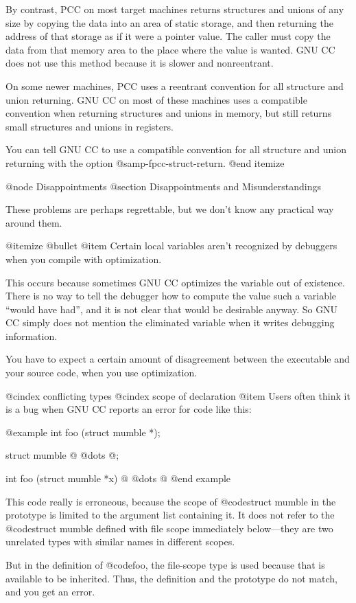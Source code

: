By contrast, PCC on most target machines returns structures and unions
of any size by copying the data into an area of static storage, and then
returning the address of that storage as if it were a pointer value.
The caller must copy the data from that memory area to the place where
the value is wanted.  GNU CC does not use this method because it is
slower and nonreentrant.

On some newer machines, PCC uses a reentrant convention for all
structure and union returning.  GNU CC on most of these machines uses a
compatible convention when returning structures and unions in memory,
but still returns small structures and unions in registers.

You can tell GNU CC to use a compatible convention for all structure and
union returning with the option @samp{-fpcc-struct-return}.
@end itemize

@node Disappointments
@section Disappointments and Misunderstandings

These problems are perhaps regrettable, but we don't know any practical
way around them.

@itemize @bullet
@item
Certain local variables aren't recognized by debuggers when you compile
with optimization.

This occurs because sometimes GNU CC optimizes the variable out of
existence.  There is no way to tell the debugger how to compute the
value such a variable ``would have had'', and it is not clear that would
be desirable anyway.  So GNU CC simply does not mention the eliminated
variable when it writes debugging information.

You have to expect a certain amount of disagreement between the
executable and your source code, when you use optimization.

@cindex conflicting types
@cindex scope of declaration
@item
Users often think it is a bug when GNU CC reports an error for code
like this:

@example
int foo (struct mumble *);

struct mumble @{ @dots{} @};

int foo (struct mumble *x)
@{ @dots{} @}
@end example

This code really is erroneous, because the scope of @code{struct
mumble} in the prototype is limited to the argument list containing it.
It does not refer to the @code{struct mumble} defined with file scope
immediately below---they are two unrelated types with similar names in
different scopes.

But in the definition of @code{foo}, the file-scope type is used
because that is available to be inherited.  Thus, the definition and
the prototype do not match, and you get an error.

